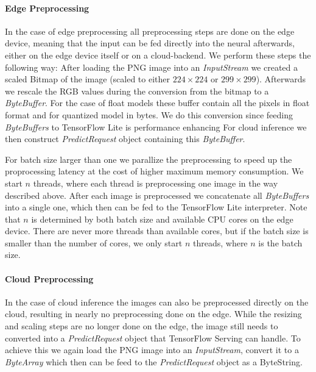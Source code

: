 \paragraph{Edge Preprocessing}
In the case of edge preprocessing all preprocessing steps are done on the edge device, meaning that the input can be fed directly into the neural afterwards, either on the edge device itself or on a cloud-backend.
We perform these steps the following way: After loading the PNG image into an \emph{InputStream} we created a scaled Bitmap of the image (scaled to either $224\times224$ or $299\times299$). 
Afterwards we rescale the RGB values during the conversion from the bitmap to a \emph{ByteBuffer}. 
For the case of float models these buffer contain all the pixels in float format and for quantized model in bytes.
We do this conversion since feeding \emph{ByteBuffers} to TensorFlow Lite is performance enhancing %
For cloud inference we then construct \emph{PredictRequest} object containing this \emph{ByteBuffer}.

For batch size larger than one we parallize the preprocessing to speed up the proprocessing latency at the cost of higher maximum memory consumption. We start $n$ threads, where each thread is preprocessing one image in the way described above. After each image is preprocessed we concatenate all \emph{ByteBuffers} into a single one, which then can be fed to the TensorFlow Lite interpreter. Note that $n$ is determined by both batch size and available CPU cores on the edge device. There are never more threads than available cores, but if the batch size is smaller than the number of cores, we only start $n$ threads, where $n$ is the batch size. 

\paragraph{Cloud Preprocessing}

In the case of cloud inference the images can also be preprocessed directly on the cloud, resulting in nearly no preprocessing done on the edge. While the resizing and scaling steps are no longer done on the edge, the image still needs to converted into a \emph{PredictRequest} object that TensorFlow Serving can handle.
To achieve this we again load the PNG image into an \emph{InputStream}, convert it to a \emph{ByteArray} which then can be feed to the \emph{PredictRequest} object as a ByteString. 



